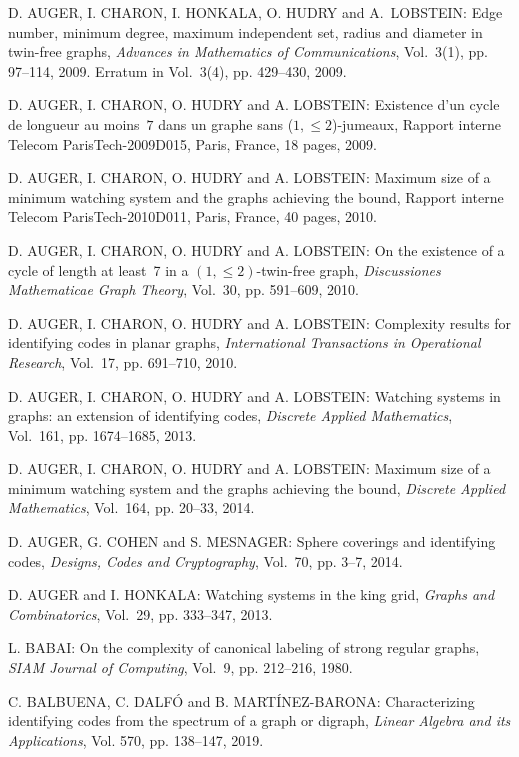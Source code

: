 \begin{thebibliography}{999}
D. AUGER, I. CHARON, I. HONKALA, O. HUDRY and A.~LOBSTEIN: Edge number, minimum degree, maximum independent set, radius and diameter in twin-free graphs, {\it Advances in Mathematics of Communications}, Vol.~3(1), pp. 97--114, 2009. Erratum in Vol.~3(4), pp. 429--430, 2009.

D. AUGER, I. CHARON, O. HUDRY and A. LOBSTEIN: Existence d'un cycle de longueur au moins~$7$ dans un graphe sans ($1,\leq 2$)-jumeaux, Rapport interne Telecom ParisTech-2009D015, Paris, France, 18 pages, 2009.

D. AUGER, I. CHARON, O. HUDRY and A. LOBSTEIN: Maximum size of a minimum watching system and the graphs achieving the bound, Rapport interne Telecom ParisTech-2010D011, Paris, France, 40 pages, 2010.

D. AUGER, I. CHARON, O. HUDRY and A. LOBSTEIN: On the existence of a cycle of length at least~7 in a $(1,\leq 2)$-twin-free graph, {\it Discussiones Mathematicae Graph Theory}, Vol.~30, pp. 591--609, 2010.

D. AUGER, I. CHARON, O. HUDRY and A. LOBSTEIN: Complexity results for identifying codes in planar graphs, {\it International Transactions in Operational Research}, Vol.~17, pp. 691--710, 2010.

D. AUGER, I. CHARON, O. HUDRY and A. LOBSTEIN: Watching systems in graphs: an extension of identifying codes, {\it Discrete Applied Mathematics}, Vol.~161, pp. 1674--1685, 2013.

D. AUGER, I. CHARON, O. HUDRY and A. LOBSTEIN: Maximum size of a minimum watching system and the graphs achieving the bound, {\it Discrete Applied Mathematics}, Vol.~164, pp. 20--33, 2014.

D. AUGER, G. COHEN and S. MESNAGER: Sphere coverings and identifying codes, {\it Designs, Codes and Cryptography}, Vol.~70, pp. 3--7, 2014.

D. AUGER and I. HONKALA: Watching systems in the king grid, {\it Graphs and Combinatorics}, Vol.~29, pp. 333--347, 2013.

L. BABAI: On the complexity of canonical labeling of strong regular graphs, {\it SIAM Journal of Computing}, Vol.~9, pp. 212--216, 1980.

C. BALBUENA, C. DALF\'O and B. MART\'INEZ-BARONA: Characterizing identifying codes from the spectrum of a graph or digraph, {\it Linear Algebra and its Applications}, Vol. 570, pp. 138--147, 2019.


\end{thebibliography}
